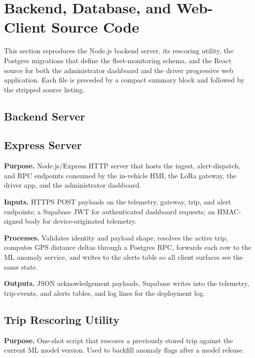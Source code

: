 \section{Backend, Database, and Web-Client Source Code}
\label{sec:app_web_code}

This section reproduces the Node.js backend server, its rescoring utility, the Postgres migrations that define the fleet-monitoring schema, and the React source for both the administrator dashboard and the driver progressive web application. Each file is preceded by a compact summary block and followed by the stripped source listing.

\subsection*{Backend Server}

\subsection{Express Server}
\label{sec:code_backend_server}

\noindent\textbf{Purpose.} Node.js/Express HTTP server that hosts the ingest, alert-dispatch, and RPC endpoints consumed by the in-vehicle HMI, the LoRa gateway, the driver app, and the administrator dashboard.

\noindent\textbf{Inputs.} HTTPS POST payloads on the telemetry, gateway, trip, and alert endpoints; a Supabase JWT for authenticated dashboard requests; an HMAC-signed body for device-originated telemetry.

\noindent\textbf{Processes.} Validates identity and payload shape, resolves the active trip, computes GPS distance deltas through a Postgres RPC, forwards each row to the ML anomaly service, and writes to the alerts table so all client surfaces see the same state.

\noindent\textbf{Outputs.} JSON acknowledgement payloads, Supabase writes into the telemetry, trip-events, and alerts tables, and log lines for the deployment log.



\subsection{Trip Rescoring Utility}
\label{sec:code_backend_rescore}

\noindent\textbf{Purpose.} One-shot script that rescores a previously stored trip against the current ML model version. Used to backfill anomaly flags after a model release.

